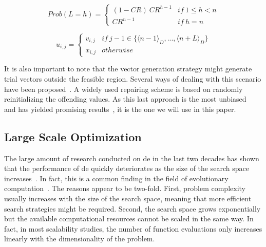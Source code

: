 \documentclass[review,3p]{elsarticle}
\newcommand{\DE}{{\sc de}}
\begin{document}
\begin{equation}
	\label{eq:geometric_dist}
	Prob(L=h) = \left \{
	\begin{array}{ll}
		(1 - CR)\ CR^{h-1} & if \ 1 \leq h < n \\
		CR^{n-1}                 & if \ h = n
	\end{array} \right.
\end{equation}

\begin{equation}
	\label{eq:exp}
 u_{i,j} = \left \{
 \begin{array}{ll}
 		v_{i,j} & if\ j-1 \in \{\langle n-1 \rangle _D , ..., \langle n + L \rangle _D\}\\
		x_{i,j} & otherwise
 \end{array} \right.
\end{equation}

It is also important to note that the vector generation strategy might
generate trial vectors outside the feasible region.
%
Several ways of dealing with this scenario have been proposed~\cite{Price:05}.
%
%
%
%
A widely used repairing scheme is based on randomly reinitializing the offending values.
%
As this last approach is the most unbiased~\cite{Price:05} and has yielded promising results~\cite{Qin:09}, it is the one we will use in this paper.

\subsection{Large Scale Optimization}

The large amount of research conducted on \DE{} in the last two decades has shown that the performance of \DE{} quickly
deteriorates as the size of the search space increases~\cite{Das:11}.
%
In fact, this is a common finding in the field of evolutionary computation~\cite{Weise:12}.
%
The reasons appear to be two-fold.
%
First, problem complexity usually increases with the size of the search space,
meaning that more efficient search strategies might be required.
%
Second, the search space grows exponentially but the available computational resources cannot be
scaled in the same way.
%
In fact, in most scalability studies, the number of function evaluations only increases linearly with the dimensionality of the problem.
\end{document}
